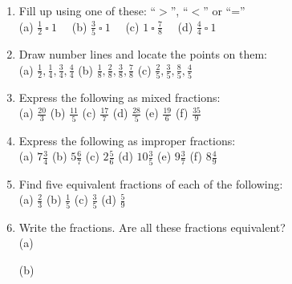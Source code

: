 \documentclass[a4paper,leqno,12pt]{amsart}
\begin{document}
\begin{enumerate}
\item Fill up using one of these:  \enquote{$>$},  \enquote{$<$} or \enquote{=} \\

(a) $\frac{1}{2} \ \square \ 1 \quad$ (b) $\frac{3}{5} \ \square \ 1 \quad$ (c) $1 \ \square \ \frac{7}{8} \quad$ (d) $\frac{4}{4} \ \square \ 1 \quad$
 
\item Draw number lines and locate the points on them:\\

(a) $\frac{1}{2}, \frac{1}{4}, \frac{3}{4}, \frac{4}{4}$ \quad (b) $\frac{1}{8}, \frac{2}{8}, \frac{3}{8}, \frac{7}{8}$ \quad (c) $\frac{2}{5}, \frac{3}{5}, \frac{8}{5}, \frac{4}{5}$

\item Express the following as mixed fractions:\\

(a) $\frac{20}{3}$ \quad (b) $\frac{11}{5}$ \quad (c) $\frac{17}{7}$ \quad (d) $\frac{28}{5}$ \quad (e) $\frac{19}{6}$ \quad (f) $\frac{35}{9}$

\item Express the following as improper fractions:\\

(a) $7\frac{3}{4}$ \quad (b) $5\frac{6}{7}$ \quad (c) $2\frac{5}{6}$ \quad (d) $10\frac{3}{5}$ \quad (e) $9\frac{3}{7}$ \quad (f) $8\frac{4}{9}$

\item Find five equivalent fractions of each of the following:\\

(a) $\frac{2}{3}$ \quad (b) $\frac{1}{5}$ \quad (c) $\frac{3}{5}$ \quad (d) $\frac{5}{9}$

\item Write the fractions. Are all these fractions equivalent?\\

(a)
\quad
(b)
\end{enumerate}
\end{document}
